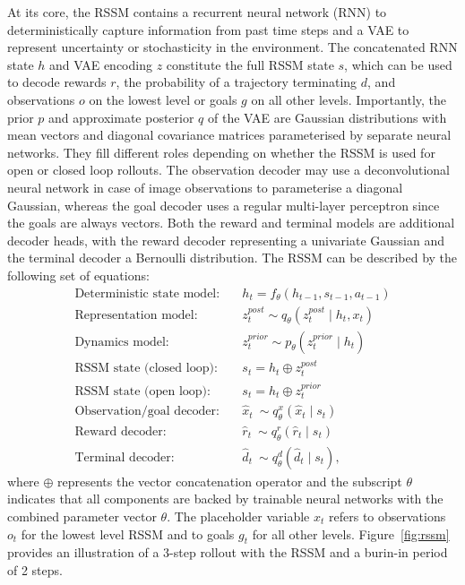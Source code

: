 \documentclass{article}
\DeclareMathOperator{\cond}{\vert}
\begin{document}
At its core, the RSSM contains a recurrent neural network (RNN) to deterministically capture information from past time steps and a VAE to represent uncertainty or stochasticity in the environment.
The concatenated RNN state $h$ and VAE encoding $z$ constitute the full RSSM state $s$, which can be used to decode rewards $r$, the probability of a trajectory terminating $d$, and observations $o$ on the lowest level or goals $g$ on all other levels.
Importantly, the prior $p$ and approximate posterior $q$ of the VAE are Gaussian distributions with mean vectors and diagonal covariance matrices parameterised by separate neural networks. They fill different roles depending on whether the RSSM is used for open or closed loop rollouts. The observation decoder may use a deconvolutional neural network in case of image observations to parameterise a diagonal Gaussian, whereas the goal decoder uses a regular multi-layer perceptron since the goals are always vectors. Both the reward and terminal models are additional decoder heads, with the reward decoder representing a univariate Gaussian and the terminal decoder a Bernoulli distribution. The RSSM can be described by the following set of equations:
\begin{align}
    \textrm{Deterministic state model:}\quad & h_t = f_\theta(h_{t-1}, s_{t-1}, a_{t-1}) \\
    \textrm{Representation model:}\quad & z_t^{post} \sim q_\theta(z_t^{post} \cond h_t, x_t) \\
    \textrm{Dynamics model:}\quad & z_t^{prior} \sim p_\theta(z_t^{prior} \cond h_t) \\
    \textrm{RSSM state (closed loop):}\quad & s_t = h_t \oplus  z_t^{post} \label{eqn:rssm_state_cl}\\
    \textrm{RSSM state (open loop):}\quad & s_t = h_t \oplus z_t^{prior} \label{eqn:rssm_state_ol}\\
    \textrm{Observation/goal decoder:}\quad & \hat{x}_t ~\sim q_\theta^x(\hat{x}_t \cond s_t) \label{eqn:rssm_obsgoal_decoder}\\
    \textrm{Reward decoder:}\quad & \hat{r}_t ~\sim q_\theta^r(\hat{r}_t \cond s_t) \\
    \textrm{Terminal decoder:}\quad & \hat{d}_t ~\sim q_\theta^d(\hat{d}_t \cond s_t),
\end{align}
where $\oplus$ represents the vector concatenation operator and the subscript $\theta$ indicates that all components are backed by trainable neural networks with the combined parameter vector $\theta$. The placeholder variable $x_t$ refers to observations $o_t$ for the lowest level RSSM and to goals $g_t$ for all other levels. Figure~\ref{fig:rssm} provides an illustration of a 3-step rollout with the RSSM and a burin-in period of 2 steps.
\end{document}
